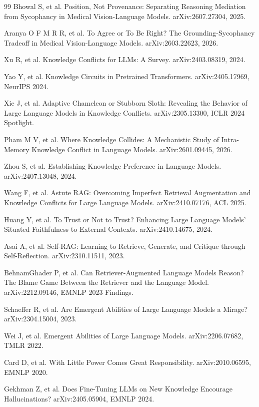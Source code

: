 \documentclass[pdflatex,sn-basic,Numbered]{sn-jnl}
\theoremstyle{thmstyleone}
\theoremstyle{thmstyletwo}
\theoremstyle{thmstylethree}
\begin{document}
\begin{thebibliography}{99}
Bhowal S, et al. Position, Not Provenance: Separating Reasoning Mediation from Sycophancy in Medical Vision-Language Models. arXiv:2607.27304, 2025.

Aranya O F M R R, et al. To Agree or To Be Right? The Grounding-Sycophancy Tradeoff in Medical Vision-Language Models. arXiv:2603.22623, 2026.

Xu R, et al. Knowledge Conflicts for LLMs: A Survey. arXiv:2403.08319, 2024.

Yao Y, et al. Knowledge Circuits in Pretrained Transformers. arXiv:2405.17969, NeurIPS 2024.

Xie J, et al. Adaptive Chameleon or Stubborn Sloth: Revealing the Behavior of Large Language Models in Knowledge Conflicts. arXiv:2305.13300, ICLR 2024 Spotlight.

Pham M V, et al. Where Knowledge Collides: A Mechanistic Study of Intra-Memory Knowledge Conflict in Language Models. arXiv:2601.09445, 2026.

Zhou S, et al. Establishing Knowledge Preference in Language Models. arXiv:2407.13048, 2024.

Wang F, et al. Astute RAG: Overcoming Imperfect Retrieval Augmentation and Knowledge Conflicts for Large Language Models. arXiv:2410.07176, ACL 2025.

Huang Y, et al. To Trust or Not to Trust? Enhancing Large Language Models' Situated Faithfulness to External Contexts. arXiv:2410.14675, 2024.

Asai A, et al. Self-RAG: Learning to Retrieve, Generate, and Critique through Self-Reflection. arXiv:2310.11511, 2023.

BehnamGhader P, et al. Can Retriever-Augmented Language Models Reason? The Blame Game Between the Retriever and the Language Model. arXiv:2212.09146, EMNLP 2023 Findings.

Schaeffer R, et al. Are Emergent Abilities of Large Language Models a Mirage? arXiv:2304.15004, 2023.

Wei J, et al. Emergent Abilities of Large Language Models. arXiv:2206.07682, TMLR 2022.

Card D, et al. With Little Power Comes Great Responsibility. arXiv:2010.06595, EMNLP 2020.

Gekhman Z, et al. Does Fine-Tuning LLMs on New Knowledge Encourage Hallucinations? arXiv:2405.05904, EMNLP 2024.


\end{thebibliography}
\end{document}
